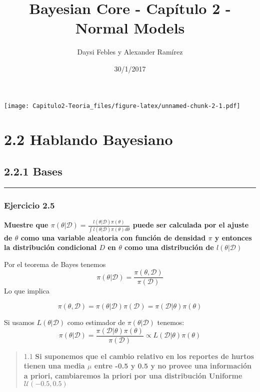 \documentclass[12pt,]{article}
\title{Bayesian Core - Capítulo 2 - Normal Models}
\author{Daysi Febles y Alexander Ramírez}
\date{30/1/2017}
\begin{document}
\maketitle

{
\setcounter{tocdepth}{4}
\tableofcontents
}
\texttt{[image: Capitulo2-Teoria\_files/figure-latex/unnamed-chunk-2-1.pdf]}

\section{2.2 Hablando Bayesiano}\label{hablando-bayesiano}

\subsection{2.2.1 Bases}\label{bases}

\begin{center}\rule{0.5\linewidth}{\linethickness}\end{center}

\subsubsection{Ejercicio 2.5}\label{ejercicio-2.5}

\textbf{Muestre que
\(\pi(\theta|\mathcal{D})=\frac{l(\theta|\mathcal{D})\pi(\theta)}{\int l(\theta|\mathcal{D})\pi(\theta) d\theta}\)
puede ser calculada por el ajuste de \(\theta\) como una variable
aleatoria con función de densidad \(\pi\) y entonces la distribución
condicional \(D\) en \(\theta\) como una distribución de
\(l(\theta|\mathcal{D})\)}

Por el teorema de Bayes tenemos
\[\pi(\theta| \mathcal{D})=\frac{\pi(\theta, \mathcal{D})}{\pi({\mathcal{D}})}\]
Lo que implica

\[\pi(\theta, \mathcal{D})=\pi(\theta| \mathcal{D})\pi({\mathcal{D}})=\pi(\mathcal{D}|\theta)\pi(\theta)\]

Si usamos \(L(\theta|\mathcal{D})\) como estimador de
\(\pi(\theta|\mathcal{D})\) tenemos:
\[\pi(\theta| \mathcal{D})=\frac{\pi(\mathcal{D}|\theta)\pi(\theta)}{\pi({\mathcal{\mathcal{D}}})}\propto L(\mathcal{D}|\theta)\pi(\theta)\]

\begin{quote}
1.1 \textbf{Si suponemos que el cambio relativo en los reportes de
hurtos tienen una media \(\mu\) entre -0.5 y 0.5 y no provee una
información a priori, cambiaremos la priori por una distribución
Uniforme \(\mathcal{U}(-0.5,0.5)\)}
\end{quote}
\end{document}
